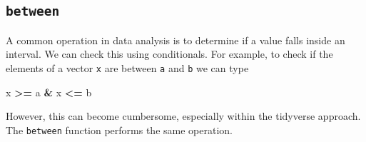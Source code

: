 \documentclass[
]{krantz}
\newenvironment{Shaded}{\begin{snugshade}}{\end{snugshade}}
\newcommand{\CommentTok}[1]{\textcolor[rgb]{0.37,0.37,0.37}{\textit{#1}}}
\newcommand{\DataTypeTok}[1]{\textcolor[rgb]{0.27,0.27,0.27}{#1}}
\newcommand{\DecValTok}[1]{\textcolor[rgb]{0.06,0.06,0.06}{#1}}
\newcommand{\KeywordTok}[1]{\textcolor[rgb]{0.27,0.27,0.27}{\textbf{#1}}}
\newcommand{\NormalTok}[1]{#1}
\newcommand{\OperatorTok}[1]{\textcolor[rgb]{0.43,0.43,0.43}{\textbf{#1}}}
\newcommand{\OtherTok}[1]{\textcolor[rgb]{0.37,0.37,0.37}{#1}}
\newcommand{\StringTok}[1]{\textcolor[rgb]{0.5,0.5,0.5}{#1}}
\begin{document}
\begin{Shaded}
\end{Shaded}

\hypertarget{between}{%
\subsection{\texorpdfstring{\texttt{between}}{between}}\label{between}}

A common operation in data analysis is to determine if a value falls inside an interval. We can check this using conditionals. For example, to check if the elements of a vector \texttt{x} are between \texttt{a} and \texttt{b} we can type

\begin{Shaded}
\begin{Highlighting}[]
\NormalTok{x }\OperatorTok{>=}\StringTok{ }\NormalTok{a }\OperatorTok{&}\StringTok{ }\NormalTok{x }\OperatorTok{<=}\StringTok{ }\NormalTok{b}
\end{Highlighting}
\end{Shaded}

However, this can become cumbersome, especially within the tidyverse approach. The \texttt{between} function performs the same operation.
\end{document}

